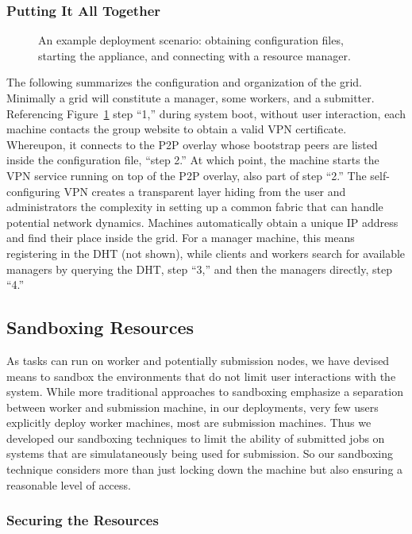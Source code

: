 \documentclass[conference]{IEEEtran}
\begin{document}
\subsubsection{Putting It All Together}

\begin{figure}[ht]
\centering
{}
\caption{An example deployment scenario:  obtaining configuration files,
starting the appliance, and connecting with a resource manager.}
\label{fig:system}
\end{figure}

The following summarizes the configuration and organization of the grid.
Minimally a grid will constitute a manager, some workers, and a submitter.
Referencing Figure~\ref{fig:system} step ``1,'' during system boot, without
user interaction, each machine contacts the group website to obtain a valid VPN
certificate.  Whereupon, it connects to the P2P overlay whose bootstrap peers
are listed inside the configuration file, ``step 2.''  At which point, the
machine starts the VPN service running on top of the P2P overlay, also part of
step ``2.'' The self-configuring VPN creates a transparent layer hiding from
the user and administrators the complexity in setting up a common fabric that
can handle potential network dynamics.  Machines automatically obtain a unique
IP address and find their place inside the grid.  For a manager machine, this
means registering in the DHT (not shown), while clients and workers search for
available managers by querying the DHT, step ``3,'' and then the managers
directly, step ``4.''  

\subsection{Sandboxing Resources}

As tasks can run on worker and potentially submission nodes, we have devised
means to sandbox the environments that do not limit user interactions with the
system.  While more traditional approaches to sandboxing emphasize a separation
between worker and submission machine, in our deployments, very few users
explicitly deploy worker machines, most are submission machines.  Thus we
developed our sandboxing techniques to limit the ability of submitted jobs on
systems that are simulataneously being used for submission.  So our sandboxing
technique considers more than just locking down the machine but also ensuring a
reasonable level of access.

\subsubsection{Securing the Resources}
\end{document}
